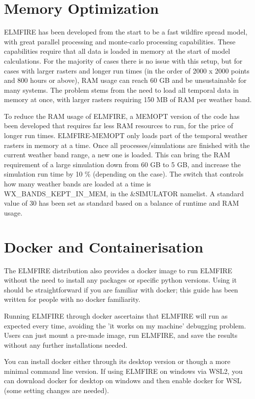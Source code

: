 \section{Memory Optimization}
\label{memopt}

ELMFIRE has been developed from the start to be a fast wildfire spread model, with great parallel processing and monte-carlo processing capabilities. These capabilities require that all data is loaded in memory at the start of model calculations. For the majority of cases there is no issue with this setup, but for cases with larger rasters and longer run times (in the order of 2000 x 2000 points and 800 hours or above), RAM usage can reach 60 GB and be unsustainable for many systems. The problem stems from the need to load all temporal data in memory at once, with larger rasters requiring 150 MB of RAM per weather band. 

To reduce the RAM usage of ELMFIRE, a MEMOPT version of the code has been developed that requires far less RAM resources to run, for the price of longer run times. ELMFIRE-MEMOPT only loads part of the temporal weather rasters in memory at a time. Once all processes/simulations are finished with the current weather band range, a new one is loaded. This can bring the RAM requirement of a large simulation down from 60 GB to 5 GB, and increase the simulation run time by 10 \% (depending on the case). The switch that controls how many weather bands are loaded at a time is WX\_BANDS\_KEPT\_IN\_MEM, in the \&SIMULATOR namelist. A standard value of 30 has been set as standard based on a balance of runtime and RAM usage. 

\section{Docker and Containerisation}

The ELMFIRE distribution also provides a docker image to run ELMFIRE without the need to install any packages or specific python versions. Using it should be straightforward if you are familiar with docker; this guide has been written for people with no docker familiarity. 

Running ELMFIRE through docker ascertains that ELMFIRE will run as expected every time, avoiding the 'it works on my machine' debugging problem. Users can just mount a pre-made image, run ELMFIRE, and save the results without any further installations needed. 

You can install docker either through its desktop version or though a more minimal command line version. If using ELMFIRE on windows via WSL2, you can download docker for desktop on windows and then enable docker for WSL (some setting changes are needed). 

